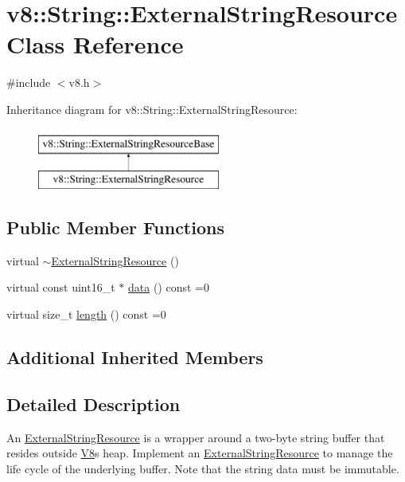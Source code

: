 \hypertarget{classv8_1_1String_1_1ExternalStringResource}{}\section{v8\+:\+:String\+:\+:External\+String\+Resource Class Reference}
\label{classv8_1_1String_1_1ExternalStringResource}


{\ttfamily \#include $<$v8.\+h$>$}

Inheritance diagram for v8\+:\+:String\+:\+:External\+String\+Resource\+:\begin{figure}[H]
\begin{center}
\leavevmode
\includegraphics[height=2.000000cm]{classv8_1_1String_1_1ExternalStringResource}
\end{center}
\end{figure}
\subsection*{Public Member Functions}
\begin{DoxyCompactItemize}
\item 
virtual \mbox{\hyperlink{classv8_1_1String_1_1ExternalStringResource_a6b7ef9e33a47059092e1447b10c35416}{$\sim$\+External\+String\+Resource}} ()
\item 
virtual const uint16\+\_\+t $\ast$ \mbox{\hyperlink{classv8_1_1String_1_1ExternalStringResource_a987309199b848511adb708e221e0fb0a}{data}} () const =0
\item 
virtual size\+\_\+t \mbox{\hyperlink{classv8_1_1String_1_1ExternalStringResource_ab5ca300fea077d7c7774ec49d32e4da1}{length}} () const =0
\end{DoxyCompactItemize}
\subsection*{Additional Inherited Members}


\subsection{Detailed Description}
An \mbox{\hyperlink{classv8_1_1String_1_1ExternalStringResource}{External\+String\+Resource}} is a wrapper around a two-\/byte string buffer that resides outside \mbox{\hyperlink{classv8_1_1V8}{V8}}\textquotesingle{}s heap. Implement an \mbox{\hyperlink{classv8_1_1String_1_1ExternalStringResource}{External\+String\+Resource}} to manage the life cycle of the underlying buffer. Note that the string data must be immutable. 

